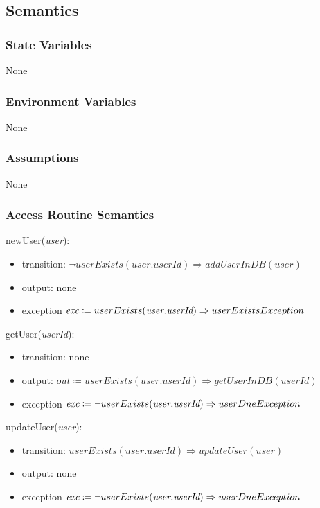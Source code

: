 \documentclass[12pt, titlepage]{article}
\begin{document}
\subsection{Semantics}

\subsubsection{State Variables}
None

\subsubsection{Environment Variables}
None

\subsubsection{Assumptions}
None

\subsubsection{Access Routine Semantics}

\noindent newUser(\textit{user}):
\begin{itemize}
\item transition: \( \neg userExists(\textit{user.userId}) \Rightarrow addUserInDB(\textit{user})\) 
\item output: none
\item exception \( \textit{exc} \coloneqq userExists(\textit{user.userId}) \Rightarrow \\ userExistsException\)
\end{itemize}

\noindent getUser(\textit{userId}):
\begin{itemize}
\item transition: none
\item output: \( \textit{out} \coloneqq userExists(\textit{user.userId}) \Rightarrow getUserInDB(userId)\)
\item exception \( \textit{exc} \coloneqq \neg userExists(\textit{user.userId}) \Rightarrow \\ userDneException\)
\end{itemize}

\noindent updateUser(\textit{user}):
\begin{itemize}
\item transition: \( userExists(\textit{user.userId}) \Rightarrow updateUser(\textit{user})\)
\item output: none
\item exception \( \textit{exc} \coloneqq \neg userExists(\textit{user.userId}) \Rightarrow \\ userDneException\)
\end{itemize}
\end{document}
